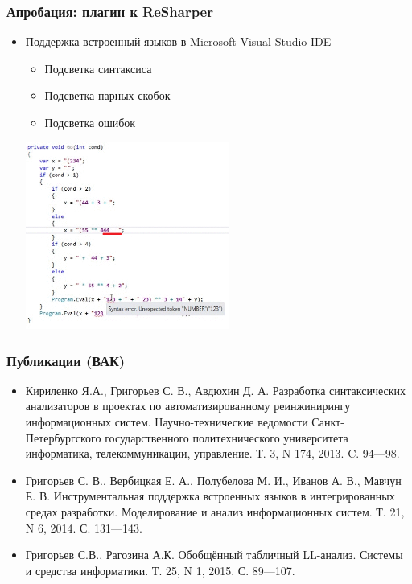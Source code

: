 \documentclass{beamer}
\begin{document}
\begin{frame}[t]
    \transwipe[direction=90]
    \frametitle{Апробация: плагин к ReSharper}
        \begin{itemize}
            \item Поддержка встроенный языков в Microsoft Visual Studio IDE
            \begin{itemize}
                \item Подсветка синтаксиса
                \item Подсветка парных скобок
                \item Подсветка ошибок
            \end{itemize}
                \includegraphics[width=190pt]{pictures/RShExampe.png}
        \end{itemize}
\end{frame}

\begin{frame}
    \transwipe[direction=90]
    \frametitle{Публикации (ВАК)}
  \begin{itemize}
      \item Кириленко Я.А., Григорьев С. В., Авдюхин Д. А. Разработка синтаксических анализаторов в проектах по автоматизированному реинжинирингу информационных систем.  Научно-технические ведомости Санкт-Петербургского государственного политехнического университета информатика, телекоммуникации, управление. Т. 3, N 174, 2013. C. 94---98.
      \item Григорьев С. В., Вербицкая Е. А., Полубелова М. И., Иванов А. В., Мавчун Е. В. Инструментальная поддержка встроенных языков в интегрированных средах разработки. Моделирование и анализ информационных систем. Т. 21, N 6, 2014. С. 131---143.
      \item Григорьев С.В., Рагозина А.К. Обобщённый табличный LL-анализ. Системы и средства информатики. Т. 25, N 1, 2015. С. 89---107.
  \end{itemize} 
\end{frame}
\end{document}
